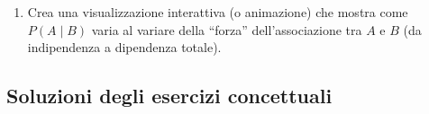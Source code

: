 \documentclass[
  italian,
  letterpaper,
  a4paper,
  11pt,
  open=any]{scrbook}
\providecommand{\tightlist}{%
  \setlength{\itemsep}{0pt}\setlength{\parskip}{0pt}}
\theoremstyle{plain}
\theoremstyle{definition}
\theoremstyle{definition}
\theoremstyle{remark}
\begin{document}
\begin{tcolorbox}
\begin{enumerate}
  \begin{itemize}
  \tightlist
  \item
    Genera dati per due gruppi con trend positivo in ciascuno
  \item
    Aggrega i dati mostrando inversione del trend
  \item
    Visualizza con ggplot
  \end{itemize}
\item
  Crea una visualizzazione interattiva (o animazione) che mostra come
  \(P(A \mid B)\) varia al variare della ``forza'' dell'associazione tra
  \(A\) e \(B\) (da indipendenza a dipendenza totale).
\end{enumerate}

\end{tcolorbox}

\begin{tcolorbox}[enhanced jigsaw, arc=.35mm, bottomrule=.15mm, bottomtitle=1mm, breakable, colback=white, colbacktitle=quarto-callout-tip-color!10!white, colframe=quarto-callout-tip-color-frame, coltitle=black, left=2mm, leftrule=.75mm, opacityback=0, opacitybacktitle=0.6, rightrule=.15mm, title=\textcolor{quarto-callout-tip-color}{\faLightbulb}\hspace{0.5em}{Soluzioni selezionate}, titlerule=0mm, toprule=.15mm, toptitle=1mm]

\subsection*{Soluzioni degli esercizi
concettuali}\label{soluzioni-degli-esercizi-concettuali}


\end{tcolorbox}
\end{document}
